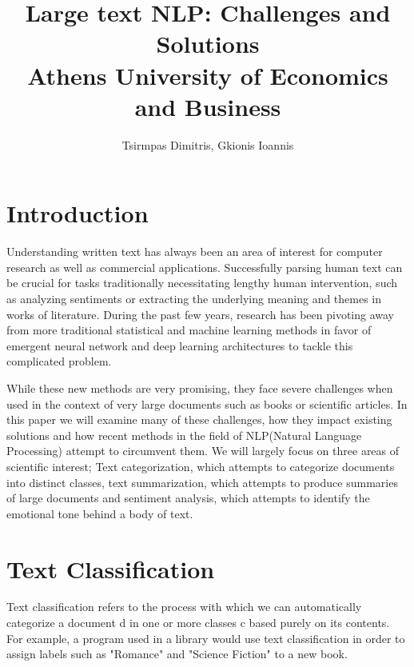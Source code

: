 \documentclass{article}
\title{Large text NLP: Challenges and Solutions\\\large Athens University of Economics and Business}
\author{Tsirmpas Dimitris, Gkionis Ioannis}
\begin{document}
	
	\begin{titlepage}
		\hypersetup{pageanchor=false} %
		\maketitle
	\end{titlepage}
	\hypersetup{pageanchor=true}
	
	\tableofcontents
	
	\section{Introduction}
	Understanding written text has always been an area of interest for computer research as well as commercial applications. Successfully parsing human text can be crucial for tasks traditionally necessitating lengthy human intervention, such as analyzing sentiments or extracting the underlying meaning and themes in works of literature. During the past few years, research has been pivoting away from more traditional statistical and machine learning methods in favor of emergent neural network and deep learning architectures to tackle this complicated problem. 
	
	While these new methods are very promising, they face severe challenges when used in the context of very large documents such as books or scientific articles. In this paper we will examine many of these challenges, how they impact existing solutions and how recent methods in the field of NLP(Natural Language Processing) attempt to circumvent them. We will largely focus on three areas of scientific interest; Text categorization, which attempts to categorize documents into distinct classes, text summarization, which attempts to produce summaries of large documents and sentiment analysis, which attempts to identify the emotional tone behind a body of text. 
	
	
	\section{Text Classification}
	Text classification refers to the process with which we can automatically categorize a document d in one or more classes c based purely on its contents. For example, a program used in a library would use text classification in order to assign labels such as "Romance" and "Science Fiction" to a new book.\par
	
\end{document}
